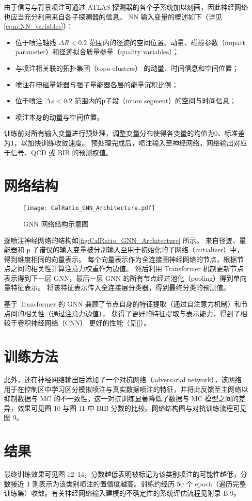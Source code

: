 由于信号与背景喷注可通过 ATLAS 探测器的各个子系统加以刻画，因此神经网络也应当充分利用来自各子探测器的信息。
NN 输入变量的概述如下（详见\autoref{cpm:NN_variables}）：
\begin{itemize}
    \item 位于喷注轴线 $\Delta R < 0.2$ 范围内的径迹的空间位置、动量、碰撞参数（impact parameter）和径迹拟合质量参量（quality variables）；
    \item 与喷注相关联的拓扑集团（topo-clusters） 的动量、时间信息和空间位置；
    \item 喷注在电磁量能器与强子量能器各层的能量沉积比例；
    \item 位于喷注 $\Delta \phi < 0.2$ 范围内的μ子段（muon segment）的空间与时间信息；
    \item 喷注本身的动量与空间位置。
\end{itemize}

训练前对所有输入变量进行预处理，调整变量分布使得各变量的均值为0、标准差为1，以加快训练收敛速度。
预处理完成后，喷注输入至神经网络，网络输出对应于信号、QCD 或 BIB 的预测权值。


\section{网络结构}
\begin{figure}[ht]
    \centering
    \texttt{[image: CalRatio\_GNN\_Architecture.pdf]}
    \caption{GNN 网络结构示意图}
    \label{fig:CalRatio_GNN_Architecture}
\end{figure}

逐喷注神经网络的结构如\autoref{fig:CalRatio_GNN_Architecture} 所示。
来自径迹、量能器和 μ 子谱仪的输入变量被分别输入至用于初始化的子网络（initializer）中，得到维度相同的向量表示。
每个向量表示作为全连接图神经网络的节点，根据节点之间的相关性计算注意力权重作为边值。
然后利用 Transformer 机制更新节点表示得到下一层 GNN，最后一层 GNN 的所有节点经过池化（pooling）得到单向量特征表示。
将该特征表示传入全连接层分类器，得到最终分类的预测值。

基于 Transformer 的 GNN 兼顾了节点自身的特征提取（通过自注意力机制）和节点间的相关性（通过注意力边值），
获得了更好的特征提取与表示能力，得到了相较于卷积神经网络（CNN）\cite{} 更好的性能（见\autoref{}）。


\section{训练方法}
此外，还在神经网络输出后添加了一个对抗网络（adversarial network），该网络用于在控制区中学习区分模拟喷注与真实数据喷注的特征，并将此反馈至主网络以抑制数据与 MC 的不一致性。这一对抗训练显著降低了数据与 MC 模型之间的差异，效果可见图 10 与图 11 中 BIB 分数的比较。网络结构图与对抗训练流程可见图 9。


\section{结果}
最终训练效果可见图 12--14，分数越低表明被标记为该类别喷注的可能性越低，分数接近 1 则表示为该类别喷注的置信度越高。训练约经历 50 个 epoch（遍历完整训练集）收敛。有关神经网络输入建模的不确定性的系统评估流程见附录 B.9。

